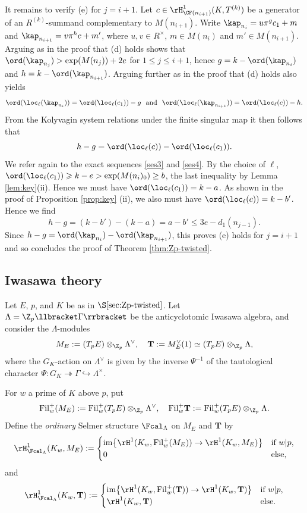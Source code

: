 It remains to verify (e) for $j=i+1$. Let $c\in \rH^1_{\CF(n_{i+1})}(K,T^{(k)})$ be a generator of an $R^{(k)}$-summand
complementary to $M(n_{i+1})$.
Write $\kap_{n_i} = u\pi^g c_1 + m$ and $\kap_{n_{i+1}} = v\pi^h c + m'$, where $u,v\in R^\times$, $m\in M(n_{i})$ and $m'\in M(n_{i+1})$. Arguing as in the proof that (d) holds shows that
$\ord(\kap_{n_j})> \exp(M(n_j))+2e$ for $1\leqslant j\leqslant i+1$, hence
$g = k - \ord(\kap_{n_i})$ and $h = k - \ord(\kap_{n_{i+1}})$.
Arguing further as in the proof that (d) holds also yields
$$
\ord(\loc_\ell(\kap_{n_i}))  = \ord(\loc_\ell(c_1))-g \ \ \text{and} \ \  \ord(\loc_\ell(\kap_{n_{i+1}})) = \ord(\loc_\ell(c))-h.
$$
From the Kolyvagin system relations under the finite singular map it then follows that
$$
h-g = \ord(\loc_\ell(c))-\ord(\loc_\ell(c_1)).
$$
We refer again to the exact sequences \eqref{ses3} and \eqref{ses4}.
By the choice of $\ell$,
$\ord(\loc_\ell(c_1))\geqslant k-e> \exp(M(n_i)_0)\geq b$, the last inequality by Lemma \ref{lem:key}(ii). Hence we must have
$\ord(\loc_\ell(c_1))=k-a$. As shown in the proof of Proposition \ref{prop:key} (ii), we also must have $\ord(\loc_\ell(c))=k-b'$. Hence we find
$$
h-g =  (k-b')-(k-a) = a-b' \leqslant 3e -d_1(n_{j-1}).
$$
Since $h-g = \ord(\kap_{n_i})-\ord(\kap_{n_{i+1}})$, this proves (e) holds for $j=i+1$ and so concludes the proof of
Theorem \ref{thm:Zp-twisted}.






\subsection{Iwasawa theory}
\label{subsec:Iw-proof}

Let $E$, $p$, and $K$ be as in $\S\ref{sec:Zp-twisted}$. Let $\Lambda=\Z_p\llbracket\Gamma\rrbracket$ be the anticyclotomic Iwasawa algebra, and consider the $\Lambda$-modules
\[
M_E:=(T_pE)\otimes_{\Z_p}\Lambda^\vee,\quad
\mathbf{T}:=M_E^\vee(1)\simeq(T_pE)\otimes_{\Z_p}\Lambda,
\]
where the $G_K$-action on $\Lambda^\vee$ is given by the inverse $\Psi^{-1}$ of the tautological character $\Psi: G_K\twoheadrightarrow\Gamma\hookrightarrow\Lambda^\times$.

For $w$ a prime of $K$ above $p$, put
\[
{\rm Fil}_w^+(M_E):={\rm Fil}_w^+(T_pE)\otimes_{\Z_p}\Lambda^\vee,\quad
{\rm Fil}_w^+\mathbf{T}:={\rm Fil}_w^+(T_pE)\otimes_{\Z_p}\Lambda.
\]
Define the \emph{ordinary} Selmer structure $\Fcal_\Lambda$ on $M_E$ and $\mathbf{T}$ by
\[
\rH^1_{\Fcal_\Lambda}(K_w,M_E):=
\begin{cases}
{\rm im}\bigl\{\rH^1(K_w,{\rm Fil}_w^+(M_E))\rightarrow\rH^1(K_w,M_E)\bigr\} & \textrm{if $w\vert p$,}\\
0& \textrm{else,}
\end{cases}
\]
and
\[
\rH^1_{\Fcal_\Lambda}(K_w,\mathbf{T}):=
\begin{cases}
{\rm im}\bigl\{\rH^1(K_w,{\rm Fil}_w^+(\mathbf{T}))\rightarrow\rH^1(K_w,\mathbf{T})\bigr\} & \textrm{if $w\vert p$,}\\
\rH^1(K_w,\mathbf{T})& \textrm{else.}
\end{cases}
\]

